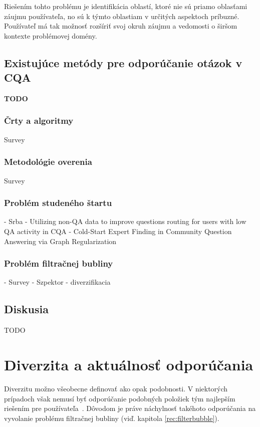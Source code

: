 Riešením tohto problému je identifikácia oblastí, ktoré nie sú priamo oblasťami záujmu používateľa, no sú k týmto
oblastiam v určitých aspektoch príbuzné. Používateľ má tak možnosť rozšíriť svoj okruh záujmu a vedomosti o širšom
kontexte problémovej domény.


\section{Existujúce metódy pre odporúčanie otázok v CQA}

\textbf{TODO}

\subsection{Črty a algoritmy}

Survey

\subsection{Metodológie overenia}

Survey

\subsection{Problém studeného štartu}
- Srba - Utilizing non-QA data to improve questions routing for users with low QA activity in CQA
- Cold-Start Expert Finding in Community Question Answering via Graph Regularization

\subsection{Problém filtračnej bubliny}
- Survey
- Szpektor - diverzifikacia

\section{Diskusia}
TODO




\chapter{Diverzita a aktuálnosť odporúčania}

Diverzitu možno všeobecne definovať ako opak podobnosti. V niektorých prípadoch však nemusí byť odporúčanie podobných
položiek tým najlepším riešením pre používateľa~\cite{Handbook2011}. Dôvodom je práve náchylnosť takéhoto odporúčania na
vyvolanie problému filtračnej bubliny (viď. kapitola \ref{rec:filterbubble}).


